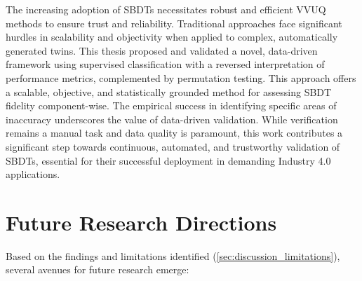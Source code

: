 The increasing adoption of SBDTs necessitates robust and efficient VVUQ methods to ensure trust and reliability. Traditional approaches face significant hurdles in scalability and objectivity when applied to complex, automatically generated twins. This thesis proposed and validated a novel, data-driven framework using supervised classification with a reversed interpretation of performance metrics, complemented by permutation testing. This approach offers a scalable, objective, and statistically grounded method for assessing SBDT fidelity component-wise. The empirical success in identifying specific areas of inaccuracy underscores the value of data-driven validation. While verification remains a manual task and data quality is paramount, this work contributes a significant step towards continuous, automated, and trustworthy validation of SBDTs, essential for their successful deployment in demanding Industry 4.0 applications.

\section{Future Research Directions}
\label{sec:conclusion_future_work}

Based on the findings and limitations identified (\autoref{sec:discussion_limitations}), several avenues for future research emerge:

